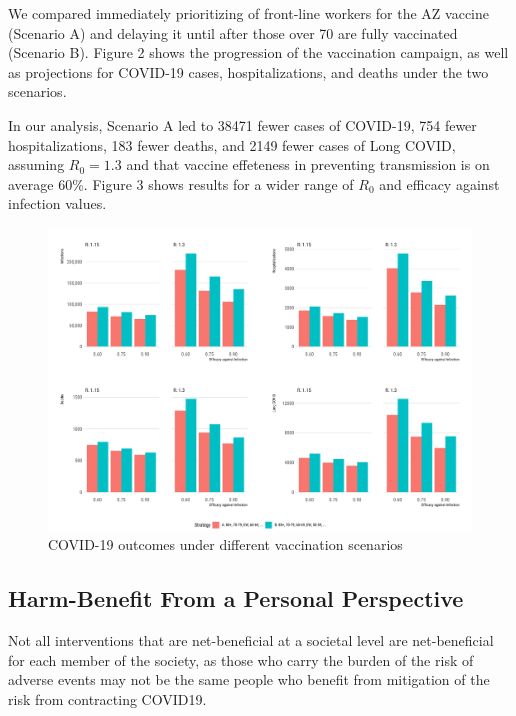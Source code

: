 \documentclass[]{interact}
\theoremstyle{plain}%
\theoremstyle{definition}
\theoremstyle{remark}
\begin{document}
We compared immediately prioritizing of front-line workers for the AZ
vaccine (Scenario A) and delaying it until after those over 70 are fully
vaccinated (Scenario B). Figure 2 shows the progression of the
vaccination campaign, as well as projections for COVID-19 cases,
hospitalizations, and deaths under the two scenarios.

In our analysis, Scenario A led to 38471 fewer cases of COVID-19, 754
fewer hospitalizations, 183 fewer deaths, and 2149 fewer cases of Long
COVID, assuming \(R_0=1.3\) and that vaccine effeteness in preventing
transmission is on average 60\%. Figure 3 shows results for a wider
range of \(R_0\) and efficacy against infection values.

\begin{figure}

{\centering \includegraphics[width=1\linewidth]{../figures/fig-barplots} 

}

\caption{COVID-19 outcomes under different vaccination scenarios}\label{fig:fig2}
\end{figure}

\hypertarget{harm-benefit-from-a-personal-perspective}{%
\subsection{Harm-Benefit From a Personal
Perspective}\label{harm-benefit-from-a-personal-perspective}}

Not all interventions that are net-beneficial at a societal level are
net-beneficial for each member of the society, as those who carry the
burden of the risk of adverse events may not be the same people who
benefit from mitigation of the risk from contracting COVID19.
\end{document}
